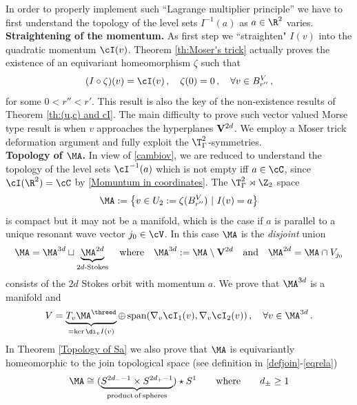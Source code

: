 \documentclass[11pt,a4paper,reqno]{article}
\numberwithin{equation}{section}
\theoremstyle{definition}
\begin{document}
In order to properly implement such ``Lagrange multiplier principle'' we have to first understand  the topology of the level sets  $ I^{-1}(a) 
$   
as $ a \in \R^2 $ varies.
\\[1mm]
{\bf Straightening of the momentum.} 
As first step we 
  ``straighten"
 $ I (v)  $ 
 into the  quadratic momentum  $ \cI (v)  $.  
 Theorem \ref{th:Moser's trick}  actually proves the existence 
of an equivariant homeomorphism $\zeta $  
such that 
\begin{equation}\label{cambiov}
(I \circ \zeta)(v) = \cI (v) \, , \quad
\zeta (0) = 0 \, ,
\quad \forall v \in B_{r''}^V \, , 
\end{equation}
for some $ 0 < r'' < r' $. 
 This 
result  is also the key of  the non-existence results of 
Theorem \ref{th:(u,c) and cI}.
The main difficulty to prove such   vector valued 
Morse type  result 
is when $ v $ approaches  the 
hyperplanes  $ {\bf V}^{2d} $.
We employ a Moser trick deformation argument and fully exploit the $ \T^2_\Gamma $-symmetries. 
\\[1mm]
{\bf Topology of $ \MA $.}
In view of \eqref{cambiov}, 
we are reduced 
to understand the topology of 
the level sets $ \cI^{-1} (a) $
which is not empty iff 
$ a \in \cC $, since     
$ \cI (\R^2) = \cC $ by \eqref{Momuntum in coordinates}. 
The $ \T^2_\Gamma \rtimes \Z_2 $
space 
$$ 
\MA := \big\{ v \in U_2 := \zeta (B_{r''}^V) \ | \ I(v) = a   \big\} 
$$ 
is compact but it may not be
a manifold, which is the case  
if $ a $
is parallel  to a unique resonant wave vector $ j_0 \in \cV  $.  
In this case 
$\MA $ is the {\it disjoint} union 
\begin{equation}\label{disj}
\MA = \MA^{3d} \sqcup 
\underbrace{\MA^{2d}}_{2d\text{-Stokes}} 
\quad   \text{where} \quad  
\MA^{3d} := 
\MA \setminus {\bf V}^{2d} 
\quad  \text{and} \quad  
\MA^{2d} = \MA \cap V_{j_0}
\end{equation}
consists of the %
$ 2 d $ Stokes orbit with momentum $ a $. We prove that $ \MA^{3d} $ is a manifold and 
$$
    V= \underbrace{T_v\MA^{\threed}}_{= \ker \di_v I (v)  }\oplus \, \text{span}(\nabla_v \cI_1(v),\nabla_v \cI_2(v))\, ,
    \quad 
\forall  v \in \MA^{3d} \,  .
$$ %
In Theorem \ref{Topology of Sa}  
we also prove that $ \MA $ is equivariantly homeomorphic to the join  topological space (see definition in  \eqref{defjoin}-\eqref{eqrela})
\begin{equation}\label{Matop}
\MA 
\cong (\underbrace{S^{2d_- -1} \times 
S^{2d_+-1}}_{\rm product \, of
\, spheres})  \star S^{1}
\qquad \text{where} 
\qquad d_\pm \geq 1
\end{equation}
\end{document}
